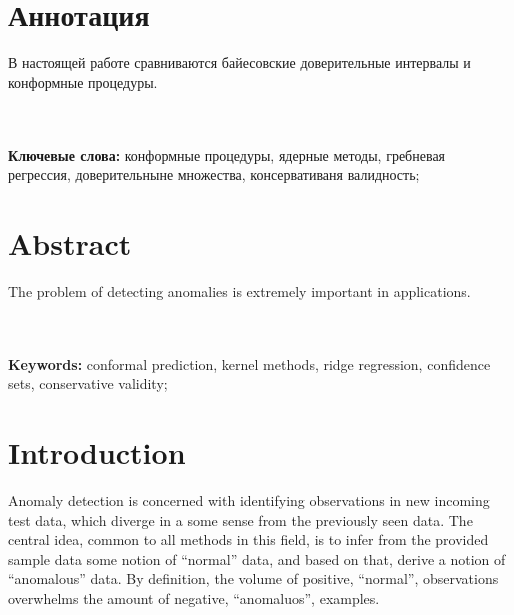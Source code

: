 \documentclass[a4paper,14pt]{extarticle}
\begin{document}
\clearpage
{}
\section*{Аннотация}

В настоящей работе сравниваются байесовские доверительные интервалы и конформные процедуры.

\hfill\\\hfill\\
\noindent\textbf{Ключевые слова:} конформные процедуры, ядерные методы, гребневая регрессия,
доверительныне множества, консервативаня валидность;

\section*{Abstract}
The problem of detecting anomalies  is extremely important in applications.

\hfill\\\hfill\\
\noindent\textbf{Keywords:} conformal prediction, kernel methods, ridge regression,
confidence sets, conservative validity;

\clearpage
{}
\tableofcontents

\clearpage
{}

\section{Introduction} %
\label{sec:introduction}

Anomaly detection is concerned with identifying observations in new incoming test
data, which diverge in a some sense from the previously seen data. The central idea,
common to all methods in this field, is to infer from the provided sample data some
notion of ``normal'' data, and based on that, derive a notion of ``anomalous'' data.
By definition, the volume of positive, ``normal'', observations overwhelms the amount
of negative, ``anomaluos'', examples.
\end{document}
